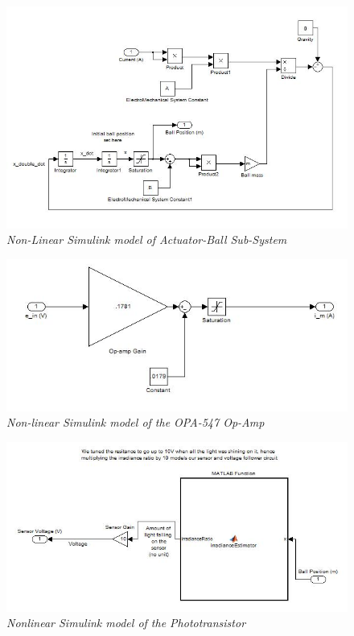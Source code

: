 \documentclass{article}
\theoremstyle{plain}
\theoremstyle{definition}
\theoremstyle{remark}
\begin{document}
\begin{figure}
\begin{center}
\includegraphics[width = 15cm]{NonLinearUnControlledActuatorBall.jpg}
\caption{\emph{Non-Linear Simulink model of Actuator-Ball Sub-System}}
\label{Q1_e4}
\end{center}
\end{figure}

\begin{figure}
\begin{center}
\includegraphics[width = 15cm]{NonLinearUnControlledDriver.jpg}
\caption{\emph{Non-linear Simulink model of the OPA-547 Op-Amp}}
\label{Q1_e5}
\end{center}
\end{figure}


\begin{figure}
\begin{center}
\includegraphics[width = 15cm]{NonLinearUnControlledPhototransistor.jpg}
\caption{\emph{Nonlinear Simulink model of the Phototransistor}}
\label{Q1_e2}
\end{center}
\end{figure}
\end{document}
